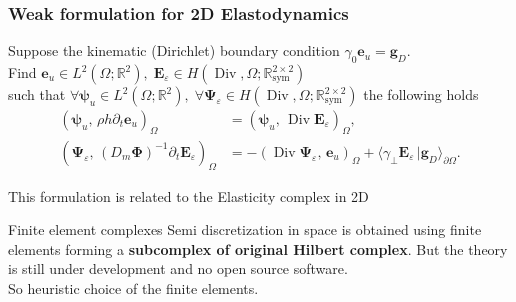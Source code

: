 \documentclass[aspectratio=169]{beamer}
\DeclareMathOperator*{\Div}{Div}
\DeclareMathOperator*{\curl}{curl}
\newcommand{\bbR}{\mathbb{R}}
\newcommand{\bbS}{\mathbb{S}}
\newcommand{\inpr}[3][]{\ensuremath{( #2, \, #3 )_{#1}}}
\newcommand{\dualpr}[3][]{\ensuremath{\langle #2 \, \vert #3 \rangle_{#1}}}
\begin{document}
\begin{frame}[fragile]\frametitle{Weak formulation for 2D Elastodynamics}
		
	\begin{tcolorbox}[nobeforeafter, colframe=theme,title=$\Div$ dual formulation]%
		Suppose the kinematic (Dirichlet) boundary condition $\gamma_0 \bm{e}_u = \bm{g}_D$. \\
		Find $\bm{e}_u \in L^2(\Omega; \bbR^2), \; \bm{E}_{\varepsilon} \in H(\Div, \Omega; \bbR^{2\times 2}_{\text{sym}})$ \\
		such that $\forall \bm{\psi}_u \in L^2(\Omega; \bbR^2), \; \forall \bm{\Psi}_\varepsilon \in H(\Div, \Omega; \bbR^{2\times 2}_{\text{sym}})$ the following holds
		\begin{equation*}
			\begin{aligned}
				\inpr[\Omega]{\bm{\psi}_u}{\rho h \partial_t \bm{e}_u} &= \inpr[\Omega]{\bm{\psi}_u}{\Div\bm{E}_{\varepsilon}}, \\
				\inpr[\Omega]{\bm{\Psi}_\varepsilon}{(D_m \bm{\Phi})^{-1} \partial_t \bm{E}_{\varepsilon}} &= -\inpr[\Omega]{\Div \bm{\Psi}_\varepsilon}{ \bm{e}_u} + \dualpr[\partial\Omega]{\gamma_\perp \bm{E}_\varepsilon}{\bm{g}_D}.
			\end{aligned} 
		\end{equation*}
	\vspace{.5cm}
	
	This formulation is related to the Elasticity complex in 2D 
	\begin{figure}[h]
		\centering
	\end{figure}
	\end{tcolorbox} 

\end{frame}


\begin{frame}{Finite element complexes}
Semi discretization in space is obtained using finite elements forming a \textbf{subcomplex of original Hilbert complex}. But the theory is still under development and no open source software. \\
\vspace{1cm}
So heuristic choice of the finite elements.
\end{frame}
\end{document}

